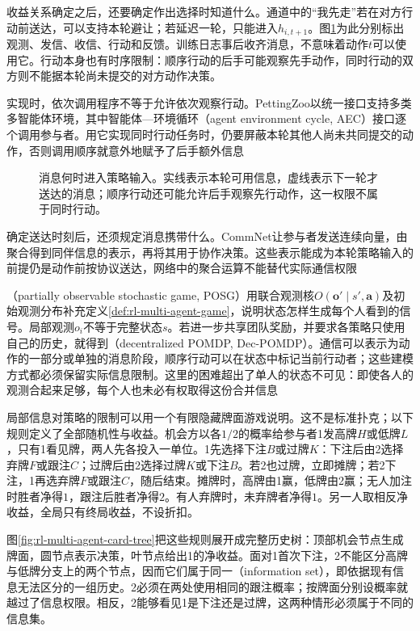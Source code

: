 收益关系确定之后，还要确定作出选择时知道什么。通道中的“我先走”若在对方行动前送达，可以支持本轮避让；若延迟一轮，只能进入$h_{i,t+1}$。图\ref{fig:rl-multi-agent-timing}为此分别标出观测、发信、收信、行动和反馈。训练日志事后收齐消息，不意味着动作$t$可以使用它。行动本身也有时序限制：顺序行动的后手可能观察先手动作，同时行动的双方则不能据本轮尚未提交的对方动作决策。

实现时，依次调用程序不等于允许依次观察行动。PettingZoo以统一接口支持多类多智能体环境，其中智能体—环境循环（agent environment cycle, AEC）接口逐个调用参与者。用它实现同时行动任务时，仍要屏蔽本轮其他人尚未共同提交的动作，否则调用顺序就意外地赋予了后手额外信息

\begin{figure}[htbp]
 \centering
 
 \caption{消息何时进入策略输入。实线表示本轮可用信息，虚线表示下一轮才送达的消息；顺序行动还可能允许后手观察先行动作，这一权限不属于同时行动。}
 \label{fig:rl-multi-agent-timing}
\end{figure}

确定送达时刻后，还须规定消息携带什么。CommNet让参与者发送连续向量，由聚合得到同伴信息的表示，再将其用于协作决策。这些表示能成为本轮策略输入的前提仍是动作前按协议送达，网络中的聚合运算不能替代实际通信权限

（partially observable stochastic game, POSG）用联合观测核$O(\bm o'\mid s',\bm a)$及初始观测分布补充定义\ref{def:rl-multi-agent-game}，说明状态怎样生成每个人看到的信号。局部观测$o_i$不等于完整状态$s$。若进一步共享团队奖励，并要求各策略只使用自己的历史，就得到（decentralized POMDP, Dec-POMDP）。通信可以表示为动作的一部分或单独的消息阶段，顺序行动可以在状态中标记当前行动者；这些建模方式都必须保留实际信息限制。这里的困难超出了单人的状态不可见：即使各人的观测合起来足够，每个人也未必有权取得这份合并信息

局部信息对策略的限制可以用一个有限隐藏牌面游戏说明。这不是标准扑克；以下规则定义了全部随机性与收益。机会方以各$1/2$的概率给参与者1发高牌$H$或低牌$L$，只有1看见牌，两人先各投入一单位。1先选择下注$B$或过牌$K$：下注后由2选择弃牌$F$或跟注$C$；过牌后由2选择过牌$K$或下注$B$。若2也过牌，立即摊牌；若2下注，1再选弃牌$F$或跟注$C$，随后结束。摊牌时，高牌由1赢，低牌由2赢；无人加注时胜者净得$1$，跟注后胜者净得$2$。有人弃牌时，未弃牌者净得$1$。另一人取相反净收益，全局只有终局收益，不设折扣。

图\ref{fig:rl-multi-agent-card-tree}把这些规则展开成完整历史树：顶部机会节点生成牌面，圆节点表示决策，叶节点给出1的净收益。面对1首次下注，2不能区分高牌与低牌分支上的两个节点，因而它们属于同一（information set），即依据现有信息无法区分的一组历史。2必须在两处使用相同的跟注概率；按牌面分别设概率就越过了信息权限。相反，2能够看见1是下注还是过牌，这两种情形必须属于不同的信息集。

